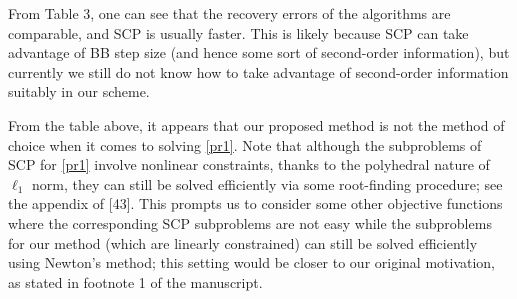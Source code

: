 \documentclass{article}
\begin{document}
\begin{enumerate}
From Table 3, one can see that the recovery errors of the algorithms are comparable, and SCP is usually faster. This is likely because SCP can take advantage of BB step size (and hence some sort of second-order information), but currently we still do not know how to take advantage of second-order information suitably in our scheme.

From the table above, it appears that our proposed method is not the method of choice when it comes to solving \eqref{pr1}.
Note that although the subproblems of SCP for \eqref{pr1} involve nonlinear constraints, thanks to the polyhedral nature of $\ell_1$ norm, they can still be solved efficiently via some root-finding procedure; see the appendix of [43]. This prompts us to consider some other objective functions where the corresponding SCP subproblems are not easy while the subproblems for our method (which are linearly constrained) can still be solved efficiently using Newton's method; this setting would be closer to our original motivation, as stated in footnote 1 of the manuscript.


\end{enumerate}
\end{document}
